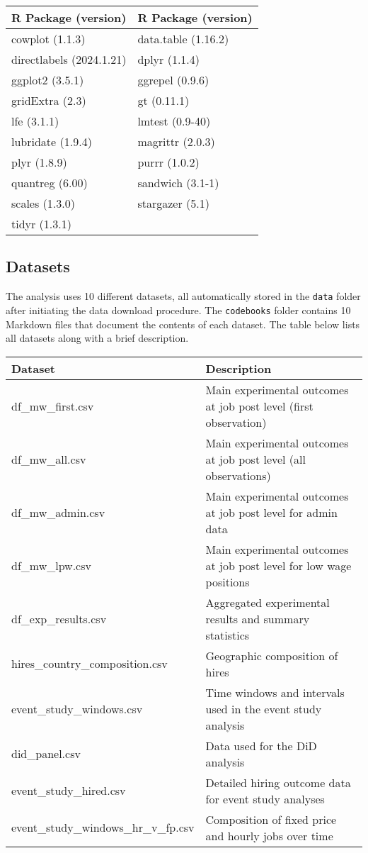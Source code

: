 \documentclass[10pt]{article}
\newenvironment{eightpt}{\begingroup\fontsize{8}{12.5}\selectfont}{\endgroup}
\begin{document}
\begin{eightpt}
\begin{tabularx}{\textwidth}{TT}
\toprule
R Package (version) & R Package (version) \\
\midrule
cowplot (1.1.3) & data.table (1.16.2) \\
directlabels (2024.1.21) & dplyr (1.1.4) \\
ggplot2 (3.5.1) & ggrepel (0.9.6) \\
gridExtra (2.3) & gt (0.11.1) \\
lfe (3.1.1) & lmtest (0.9-40) \\
lubridate (1.9.4) & magrittr (2.0.3) \\
plyr (1.8.9) & purrr (1.0.2) \\
quantreg (6.00) & sandwich (3.1-1) \\
scales (1.3.0) & stargazer (5.1) \\
tidyr (1.3.1) & \\
\bottomrule
\end{tabularx}
\end{eightpt}

\subsection{Datasets}
The analysis uses 10 different datasets, all automatically stored in the \texttt{data} folder after initiating the data download procedure. The \texttt{codebooks} folder contains 10 Markdown files that document the contents of each dataset. The table below lists all datasets along with a brief description.

\begin{eightpt}
\begin{tabularx}{\textwidth}{@{}LL@{}}
\toprule
Dataset & Description \\
\midrule
{df\_mw\_first.csv} & Main experimental outcomes at job post level (first observation) \\
{df\_mw\_all.csv} & Main experimental outcomes at job post level (all observations) \\
{df\_mw\_admin.csv} & Main experimental outcomes at job post level for admin data \\
{df\_mw\_lpw.csv} & Main experimental outcomes at job post level for low wage positions \\
{df\_exp\_results.csv} & Aggregated experimental results and summary statistics \\
{hires\_country\_composition.csv} & Geographic composition of hires \\
{event\_study\_windows.csv} & Time windows and intervals used in the event study analysis \\
{did\_panel.csv} & Data used for the DiD analysis \\
{event\_study\_hired.csv} & Detailed hiring outcome data for event study analyses \\
{event\_study\_windows\_hr\_v\_fp.csv} & Composition of fixed price and hourly jobs over time \\
\bottomrule
\end{tabularx}
\end{eightpt}
\end{document}
